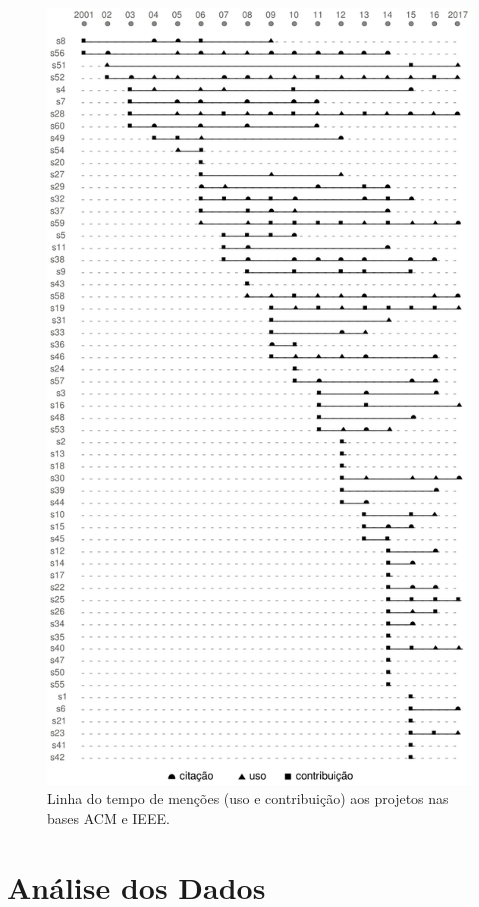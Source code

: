 \begin{figure}[h]
  \center
  \includegraphics[scale=0.7]{imagens/mentions-timeline.png}
  \caption{Linha do tempo de menções (uso e contribuição) aos projetos nas bases ACM e IEEE.}
  \label{mentions-timeline}
\end{figure}

\section{Análise dos Dados} %

